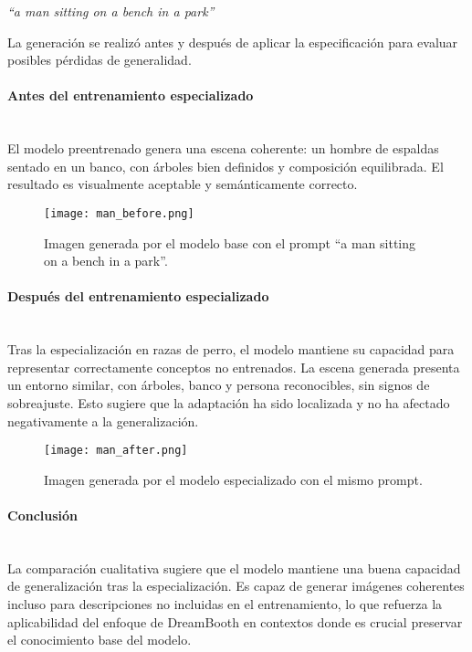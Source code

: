 \begin{center}
\textit{``a man sitting on a bench in a park''}
\end{center}

La generación se realizó antes y después de aplicar la especificación para evaluar posibles pérdidas de generalidad.

\paragraph{\textbf{Antes del entrenamiento especializado}} \mbox{}\\[0.5em]
El modelo preentrenado genera una escena coherente: un hombre de espaldas sentado en un banco, con árboles bien definidos y composición equilibrada. El resultado es visualmente aceptable y semánticamente correcto.

\begin{figure}[H]
    \centering
    \texttt{[image: man\_before.png]}
    \caption{Imagen generada por el modelo base con el prompt ``a man sitting on a bench in a park''.}
    \label{fig:man-before}
\end{figure}

\paragraph{\textbf{Después del entrenamiento especializado}} \mbox{}\\[0.5em]
Tras la especialización en razas de perro, el modelo mantiene su capacidad para representar correctamente conceptos no entrenados. La escena generada presenta un entorno similar, con árboles, banco y persona reconocibles, sin signos de sobreajuste. Esto sugiere que la adaptación ha sido localizada y no ha afectado negativamente a la generalización.

\begin{figure}[H]
    \centering
    \texttt{[image: man\_after.png]}
    \caption{Imagen generada por el modelo especializado con el mismo prompt.}
    \label{fig:man-after}
\end{figure}

\paragraph{\textbf{Conclusión}} \mbox{}\\[0.5em]
La comparación cualitativa sugiere que el modelo mantiene una buena capacidad de generalización tras la especialización. Es capaz de generar imágenes coherentes incluso para descripciones no incluidas en el entrenamiento, lo que refuerza la aplicabilidad del enfoque de DreamBooth en contextos donde es crucial preservar el conocimiento base del modelo.
